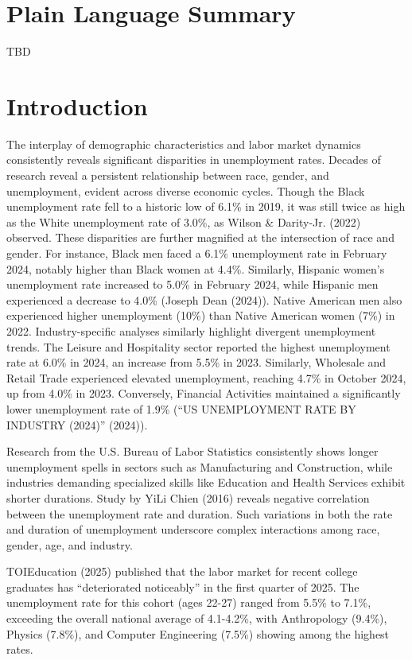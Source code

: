 \documentclass[
]{agujournal2019}
\begin{document}
\section*{Plain Language Summary}
TBD




\section{Introduction}\label{introduction}

The interplay of demographic characteristics and labor market dynamics
consistently reveals significant disparities in unemployment rates.
Decades of research reveal a persistent relationship between race,
gender, and unemployment, evident across diverse economic cycles. Though
the Black unemployment rate fell to a historic low of 6.1\% in 2019, it
was still twice as high as the White unemployment rate of 3.0\%, as
Wilson \& Darity-Jr. (2022) observed. These disparities are further
magnified at the intersection of race and gender. For instance, Black
men faced a 6.1\% unemployment rate in February 2024, notably higher
than Black women at 4.4\%. Similarly, Hispanic women's unemployment rate
increased to 5.0\% in February 2024, while Hispanic men experienced a
decrease to 4.0\% (Joseph Dean (2024)). Native American men also
experienced higher unemployment (10\%) than Native American women (7\%)
in 2022. Industry-specific analyses similarly highlight divergent
unemployment trends. The Leisure and Hospitality sector reported the
highest unemployment rate at 6.0\% in 2024, an increase from 5.5\% in
2023. Similarly, Wholesale and Retail Trade experienced elevated
unemployment, reaching 4.7\% in October 2024, up from 4.0\% in 2023.
Conversely, Financial Activities maintained a significantly lower
unemployment rate of 1.9\% ({``US UNEMPLOYMENT RATE BY INDUSTRY
(2024)''} (2024)).

Research from the U.S. Bureau of Labor Statistics consistently shows
longer unemployment spells in sectors such as Manufacturing and
Construction, while industries demanding specialized skills like
Education and Health Services exhibit shorter durations. Study by YiLi
Chien (2016) reveals negative correlation between the unemployment rate
and duration. Such variations in both the rate and duration of
unemployment underscore complex interactions among race, gender, age,
and industry.

TOIEducation (2025) published that the labor market for recent college
graduates has ``deteriorated noticeably'' in the first quarter of 2025.
The unemployment rate for this cohort (ages 22-27) ranged from 5.5\% to
7.1\%, exceeding the overall national average of 4.1-4.2\%, with
Anthropology (9.4\%), Physics (7.8\%), and Computer Engineering (7.5\%)
showing among the highest rates.
\end{document}
